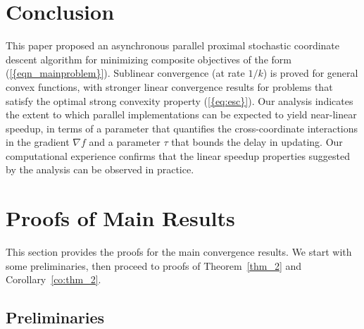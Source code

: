 \documentclass{siamltex}
\begin{document}
\section{Conclusion} \label{sec_conclusion}

This paper proposed an asynchronous parallel proximal stochastic
coordinate descent algorithm for minimizing composite objectives of
the form {(\ref{{eqn_mainproblem}})}. Sublinear convergence (at rate
$1/k$) is proved for general convex functions, with stronger linear
convergence results for problems that satisfy the optimal strong
convexity property {(\ref{{eq:esc}})}. Our analysis indicates the extent
to which parallel implementations can be expected to yield near-linear
speedup, in terms of a parameter that quantifies the cross-coordinate
interactions in the gradient $\nabla f$ and a parameter $\tau$ that
bounds the delay in updating. Our computational experience confirms
that the linear speedup properties suggested by the analysis can be
observed in practice.

\appendix

\section{Proofs of Main Results} \label{app:con}

This section provides the proofs for the main convergence results.  We
start with some preliminaries, then proceed to proofs of
Theorem~\ref{thm_2} and Corollary~\ref{co:thm_2}.

\subsection{Preliminaries}
\end{document}
